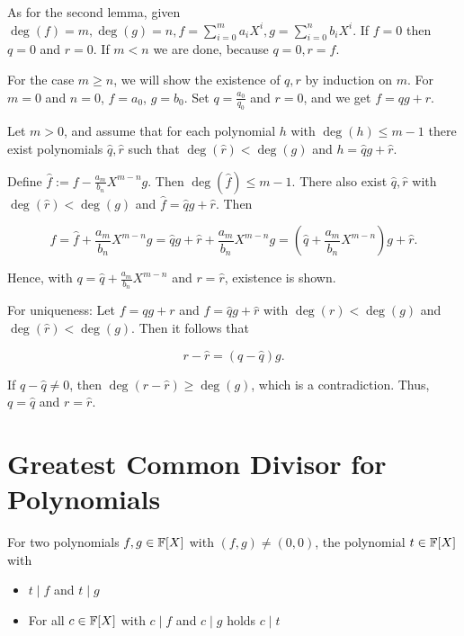 \QED

As for the second lemma, given \(\deg(f) = m, \deg(g) = n, f = \sum_{i = 0}^{m} a_i X^i, g = \sum_{i = 0}^{n} b_i X^i\).
If \(f = 0\) then \(q = 0\) and \(r = 0\). If \(m < n\) we are done, because \(q = 0, r = f\).

For the case \(m \ge n\), we will show the existence of \(q,r\) by induction on \(m\). For
\(m = 0\) and \(n = 0\), \(f = a_0\), \(g = b_0\). Set \(q = \frac{a_0}{q_0}\) and \(r = 0\), and we get
\(f = qg + r\).

Let \(m > 0\), and assume that for each polynomial \(h\) with \(\deg(h) \le m - 1\) there
exist polynomials \(\hat{q}, \hat{r}\) such that \(\deg(\hat{r}) < \deg(g)\) and
\(h = \hat{q}g + \hat{r}\).

Define \(\hat{f} := f - \frac{a_m}{b_n}X^{m - n}g\). Then \(\deg(\hat{f}) \le m - 1\). There also
exist \(\hat{q}, \hat{r}\) with \(\deg(\hat{r}) < \deg(g)\) and \(\hat{f} = \hat{q}g + \hat{r}\). Then

\[
	f = \hat{f} + \frac{a_m}{b_n} X^{m-n} g
	= \hat{q} g + \hat{r} + \frac{a_m}{b_n} X^{m-n} g
	= \left(\hat{q} + \frac{a_m}{b_n} X^{m-n}\right) g + \hat{r}.
\]

Hence, with \(q = \hat q + \frac{a_m}{b_n} X^{m-n}\) and \(r = \hat{r}\), existence is shown.

For uniqueness: Let \(f = qg + r\) and \(f = \hat{q}g + \hat{r}\)
with \(\deg(r) < \deg(g)\) and \(\deg(\hat{r}) < \deg(g)\). Then it follows that

\[
	r - \hat{r} = (q - \hat{q}) g .
\]

If \(q - \hat{q} \neq 0\), then \(\deg(r - \hat{r}) \ge \deg(g)\),
which is a contradiction. Thus, \(q = \hat{q}\) and \(r = \hat{r}\).

\QED

\section{Greatest Common Divisor for Polynomials}

For two polynomials \(f,g \in \mathbb{F}[X]\) with \((f,g) \ne (0,0)\), the polynomial \(t \in \mathbb{F}[X]\) with

\begin{itemize}

	\item \(t \mid f\) and \(t \mid g\)

	\item For all \(c \in \mathbb{F}[X]\) with \(c \mid f\) and \(c \mid g\) holds \(c \mid t\)

\end{itemize}

